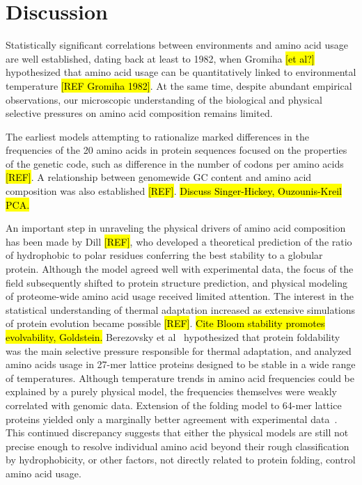 \documentclass[10pt,letterpaper]{article}
\begin{document}
\section*{Discussion}

Statistically significant correlations between environments and amino acid usage are well established, dating back at least to 1982, when Gromiha \hl{[et al?]} hypothesized that amino acid usage can be quantitatively linked to environmental temperature \hl{[REF Gromiha 1982]}. At the same time, despite abundant empirical observations, our microscopic understanding of the biological and physical selective pressures on amino acid composition remains limited.

The earliest models attempting to rationalize marked differences in the frequencies of the 20 amino acids in protein sequences focused on the properties of the genetic code, such as difference in the number of codons per amino acids \hl{[REF]}. A relationship between genomewide GC content and amino acid composition was also established \hl{[REF]}. \hl{Discuss Singer-Hickey, Ouzounis-Kreil PCA.}  

An important step in unraveling the physical drivers of amino acid composition has been made by Dill \hl{[REF]}, who developed a theoretical prediction of the ratio of hydrophobic to polar residues conferring the best stability to a globular protein. Although the model agreed well with experimental data, the focus of the field subsequently shifted to protein structure prediction, and physical modeling of proteome-wide amino acid usage received limited attention.  The interest in the statistical understanding of thermal adaptation increased as extensive simulations of protein evolution became possible \hl{[REF]}. \hl{Cite Bloom stability promotes evolvability, Goldstein.}  Berezovsky et al~\cite{Berezovsky2007Positive} hypothesized that protein foldability was the main selective pressure responsible for thermal adaptation, and analyzed amino acids usage in 27-mer lattice proteins designed to be stable in a wide range of temperatures. Although temperature trends in amino acid frequencies could be explained by a purely physical model, the frequencies themselves were weakly correlated with genomic data. Extension of the folding model to 64-mer lattice proteins yielded only a marginally better agreement with experimental data~\cite{Venev2015Massively}. This continued discrepancy suggests that either the physical models are still not precise enough to resolve individual amino acid  beyond their rough classification by hydrophobicity, or other factors, not directly related to protein folding, control amino acid usage.
\end{document}
